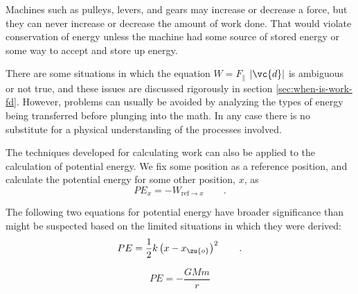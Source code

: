 \begin{summary}
\begin{summarytext}
Machines such as pulleys, levers, and gears may increase or
decrease a force, but they can never increase or decrease
the amount of work done. That would violate conservation of
energy unless the machine had some source of stored energy
or some way to accept and store up energy.

There are some situations in which the equation $W=F_{\parallel}$
$|\vc{d}|$ is ambiguous or not true, and these issues are
discussed rigorously in section \ref{sec:when-is-work-fd}. However, problems can
usually be avoided by analyzing the types of energy being
transferred before plunging into the math. In any case there
is no substitute for a physical understanding of the processes involved.

The techniques developed for calculating work can also be
applied to the calculation of potential energy. We fix some
position as a reference position, and calculate the
potential energy for some other position, $x$, as
\begin{equation*}
                PE_x  =  -W_{\text{ref}\rightarrow x}   \qquad   .
\end{equation*}

The following two equations for potential energy have
broader significance than might be suspected based on the
limited situations in which they were derived:
\begin{equation*}
  PE = \frac{1}{2}k\left(x-x_\zu{o}\right)^2  \qquad   .
\end{equation*}
\begin{longnoteafterequation}
\end{longnoteafterequation}
\begin{equation*}
                PE  = -\frac{GMm}{r}
\end{equation*}
\begin{longnoteafterequation}
\end{longnoteafterequation}
\end{summarytext}

\end{summary}
